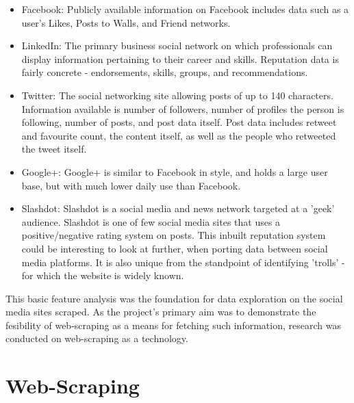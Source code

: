 


\begin{itemize}

\item Facebook: Publicly available information on Facebook includes data such as a user's Likes, Posts to Walls, and Friend networks. 
\item LinkedIn: The primary business social network on which professionals can display information pertaining to their career and skills. Reputation data is fairly concrete - endorsements, skills, groups, and recommendations. 
\item Twitter: The social networking site allowing posts of up to 140 characters. Information available is number of followers, number of profiles the person is following, number of posts, and post data itself. Post data includes retweet and favourite count, the content itself, as well as the people who retweeted the tweet itself. 
\item Google+: Google+ is similar to Facebook in style, and holds a large user base, but with much lower daily use than Facebook.
\item Slashdot: Slashdot is a social media and news network targeted at a 'geek' audience. Slashdot is one of few social media sites that uses a positive/negative rating system on posts. This inbuilt reputation system could be interesting to look at further, when porting data between social media platforms. It is also unique from the standpoint of identifying 'trolls' - for which the website is widely known. 
\end{itemize}

This basic feature analysis was the foundation for data exploration on the social media sites scraped. As the project's primary aim was to demonstrate the fesibility of web-scraping as a means for fetching such information, research was conducted on web-scraping as a technology. 

\section{Web-Scraping}

